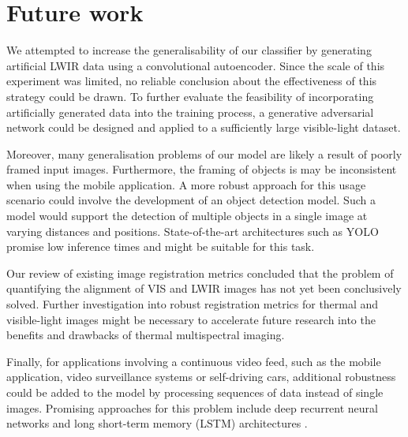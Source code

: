 \documentclass{l4proj}
\begin{document}

\section{Future work}

We attempted to increase the generalisability of our classifier by generating artificial LWIR data using a convolutional autoencoder. Since the scale of this experiment was limited, no reliable conclusion about the effectiveness of this strategy could be drawn. To further evaluate the feasibility of incorporating artificially generated data into the training process, a generative adversarial network could be designed and applied to a sufficiently large visible-light dataset.

Moreover, many generalisation problems of our model are likely a result of poorly framed input images. Furthermore, the framing of objects is may be inconsistent when using the mobile application. A more robust approach for this usage scenario could involve the development of an object detection model. Such a model would support the detection of multiple objects in a single image at varying distances and positions. State-of-the-art architectures such as YOLO \citep{redmon_you_2016, redmon_yolov3_2018} promise low inference times and might be suitable for this task. 

Our review of existing image registration metrics concluded that the problem of quantifying the alignment of VIS and LWIR images has not yet been conclusively solved. Further investigation into robust registration metrics for thermal and visible-light images might be necessary to accelerate future research into the benefits and drawbacks of thermal multispectral imaging.

Finally, for applications involving a continuous video feed, such as the mobile application, video surveillance systems or self-driving cars, additional robustness could be added to the model by processing sequences of data instead of single images. Promising approaches for this problem include deep recurrent neural networks and long short-term memory (LSTM) architectures \citep{hochreiter_long_1997}.

%
% 
\end{document}
